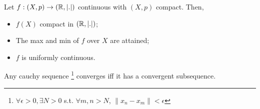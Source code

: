 \noindent Let $f: (X, p) \to (\mathbb{R}, \left| . \right| )$ continuous with $(X, p)$ compact. Then,
\begin{itemize}
    \item $f(X)$ compact in $(\mathbb{R}, \left| . \right| )$;
    \item The max and min of $f$ over $X$ are attained;  
    \item $f$ is uniformly continuous. 
\end{itemize}

\begin{lem}
    Any cauchy sequence \footnote{$\forall \epsilon > 0, \exists N > 0 $ s.t. $\forall m, n > N$,
    $\| x_n - x_m \| < \epsilon$   }
     converges iff it has a convergent subsequence.
\end{lem}

